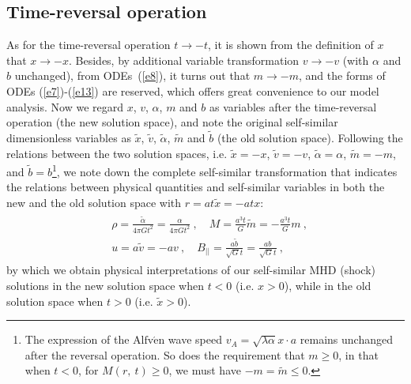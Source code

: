 \documentclass[fleqn,usenatbib]{mnras}
\begin{document}
\subsection{Time-reversal operation}
\label{s2.2}
As for the time-reversal operation $t\rightarrow -t$, it is shown from the definition of $x$ that $x\rightarrow -x$. Besides, by additional variable transformation $v\rightarrow -v$ (with $\alpha$ and $b$ unchanged), from ODEs~(\ref{e8}), it turns out that $m\rightarrow -m$, and the forms of ODEs (\ref{e7})-(\ref{e13}) are reserved, which offers great convenience to our model analysis. Now we regard $x$, $v$, $\alpha$, $m$ and $b$ as variables after the time-reversal operation (the new solution space), and note the original self-similar dimensionless variables as $\widetilde{x}$, $\widetilde{v}$, $\widetilde{\alpha}$, $\widetilde{m}$ and $\widetilde{b}$ (the old solution space). 
Following the relations between the two solution spaces, i.e. $\widetilde{x}=-x$, $\widetilde{v}=-v$, $\widetilde{\alpha}=\alpha$, $\widetilde{m}=-m$, and $\widetilde{b}=b$\footnote{The expression of the $\text{Alfv}\mathrm{\acute{e}}\text{n}$ wave speed $v_{A}=\sqrt{\lambda\alpha}x\cdot a$ remains unchanged after the reversal operation. So does the requirement that $m\geq 0$, in that when $t<0$, for $M(r,\ t)\geq 0$, we must have $-m=\widetilde{m}\leq 0$.}, we note down the complete self-similar transformation that indicates the relations between physical quantities and self-similar variables in both the new and the old solution space with $r=at\widetilde{x}=-atx$:
\begin{gather}
\begin{split}
&\rho=\frac{\widetilde{\alpha}}{4\pi Gt^{2}}=\frac{\alpha}{4\pi Gt^{2}}\ ,\quad M=\frac{a^{3}t}{G}\widetilde{m}=-\frac{a^{3}t}{G}m\ ,\\
&u=a\widetilde{v}=-av\ ,\quad B_{||}=\frac{a\widetilde{b}}{\sqrt{G}t}=\frac{ab}{\sqrt{G}t}\ ,
\end{split}\label{ex3}
\end{gather}
by which we obtain physical interpretations of our self-similar MHD (shock) solutions in the new solution space when $t<0$ (i.e. $x>0$), while in the old solution space when $t>0$ (i.e. $\widetilde{x}>0$).
\end{document}
